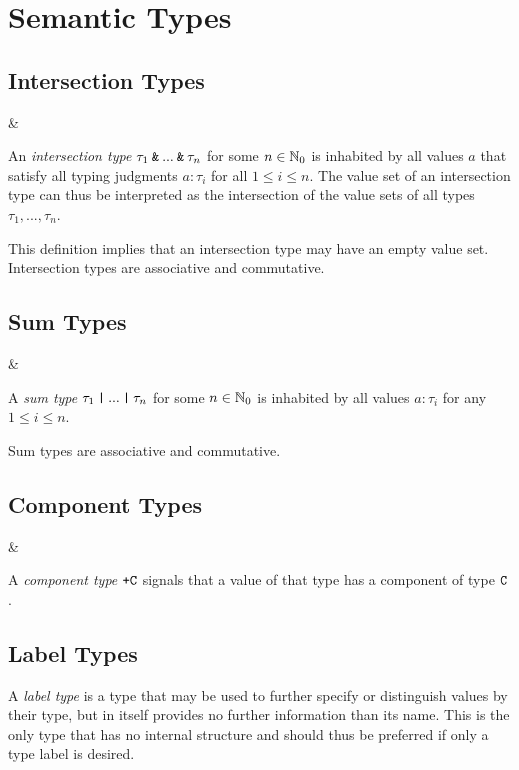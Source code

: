 \section{Semantic Types}

\subsection{Intersection Types}

\begin{grammar}
 &\produce {}
\end{grammar}

\noindent An \textit{intersection type} $\tau_1 \mathbin{\texttt{\&}} ... \mathbin{\texttt{\&}} \tau_n$ for some $n \in \mathbb{N}_0$ is inhabited by all values $a$ that satisfy all typing judgments $a : \tau_i$ for all $1 \leq i \leq n$. The value set of an intersection type can thus be interpreted as the intersection of the value sets of all types $\tau_1, ..., \tau_n$.

This definition implies that an intersection type may have an empty value set. Intersection types are associative and commutative.


\subsection{Sum Types}

\begin{grammar}
 &\produce {}
\end{grammar}

\noindent A \textit{sum type} $\tau_1 \mathbin{\texttt{|}} ... \mathbin{\texttt{|}} \tau_n$ for some $n \in \mathbb{N}_0$ is inhabited by all values $a : \tau_i$ for any $1 \leq i \leq n$. 

Sum types are associative and commutative.


\subsection{Component Types}

\begin{grammar}
 &\produce {}
\end{grammar}

\noindent A \textit{component type} $\texttt{+C}$ signals that a value of that type has a component of type $\texttt{C}$.


\subsection{Label Types}

\noindent A \textit{label type} is a type that may be used to further specify or distinguish values by their type, but in itself provides no further information than its name. This is the only type that has no internal structure and should thus be preferred if only a type label is desired.


